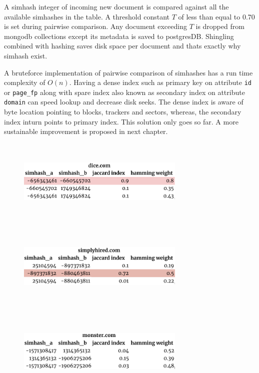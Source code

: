 \noindent
A simhash integer of incoming new document is compared against all the available simhashes in the table.
A threshold constant $T$ of less than equal to 0.70 is set during pairwise comparison. 
Any document exceeding $T$ is dropped from mongodb collections except its metadata is saved to postgresDB.
Shingling combined with hashing saves disk space per document and thats exactly why simhash exist.

\pagebreak

\noindent
A bruteforce implementation of pairwise comparison of simhashes has a run time complexity of $O(n)$.
Having a dense index such as primary key on attribute \texttt{id} or \texttt{page\_fp} along with
spare index also known as secondary index on attribute \texttt{domain} can speed lookup and decrease disk seeks. The dense index is aware of byte location pointing to blocks, trackers and sectors, whereas, the secondary index inturn points to primary index. This solution only goes so far. A more sustainable improvement
is proposed in next chapter.

\begin{figure}[h!]
  \centering
  \includegraphics[width=8cm,height=4cm,keepaspectratio]{../media/crawler/dice.png}
  \label{fig:dice}
\end{figure}

\begin{figure}[h!]
  \centering
  \includegraphics[width=8cm,height=4cm,keepaspectratio]{../media/crawler/simplyhired.png}
  \label{fig:simhired}
\end{figure}

\begin{figure}[h!]
  \centering
  \includegraphics[width=8cm,height=4cm,keepaspectratio]{../media/crawler/monster.png}
  \label{fig:simhired}
\end{figure}

